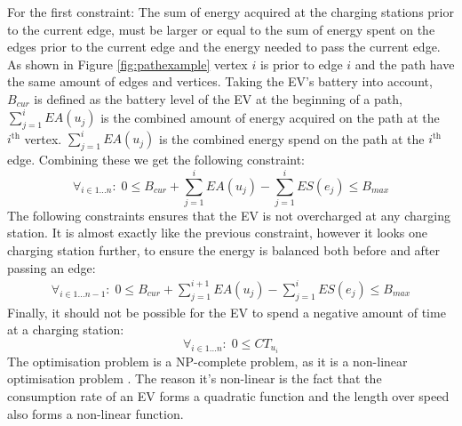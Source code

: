 For the first constraint: The sum of energy acquired at the charging stations prior to the current edge, must be larger or equal to the sum of energy spent on the edges prior to the current edge and the energy needed to pass the current edge. As shown in Figure \ref{fig:pathexample} vertex $i$ is prior to edge $i$ and the path have the same amount of edges and vertices. Taking the EV's battery into account, $B_{cur}$ is defined as the battery level of the EV at the beginning of a path, $ \sum_{j=1}^{i} EA(u_j)$ is the combined amount of energy acquired on the path at the $i^{\text{th}}$ vertex. $\sum_{j=1}^{i} EA(u_j)$ is the combined energy spend on the path at the $i^{\text{th}}$ edge. Combining these we get the following constraint:
\begin{equation*}
\forall_{i\in1 \dots n }:\;0 \leq B_{cur} + \sum_{j=1}^{i} EA(u_j) - \sum_{j=1}^{i} ES(e_j) \leq B_{max}
\end{equation*}
The following constraints ensures that the EV is not overcharged at any charging station. It is almost exactly like the previous constraint, however it looks one charging station further, to ensure the energy is balanced both before and after passing an edge:
\begin{equation*}
\begin{aligned}
\forall_{i\in1 \dots n-1}:\;0 \leq B_{cur} + \sum_{j=1}^{i+1} EA(u_j) - \sum_{j=1}^{i} ES(e_j) \leq B_{max}
\end{aligned}
\end{equation*}
Finally, it should not be possible for the EV to spend a negative amount of time at a charging station:
\begin{equation*}
\forall_{i\in1 \dots n }:\; 0 \leq CT_{u_i}
\end{equation*}
The optimisation problem is a NP-complete problem, as it is a non-linear optimisation problem \cite{Murty1987}. The reason it's non-linear is the fact that
the consumption rate of an EV forms a quadratic function and the length over speed also forms a non-linear function.
